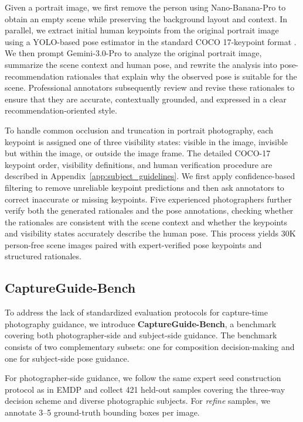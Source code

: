 \documentclass{llmxive}
\begin{document}
Given a portrait image, we first remove the person using Nano-Banana-Pro \cite{google_nanobananapro} to obtain an empty scene while preserving the background layout and context.
In parallel, we extract initial human keypoints from the original portrait image using a YOLO-based pose estimator \citep{jocher2026ultralyticsyolo26unifiedrealtime} in the standard COCO 17-keypoint format \cite{lin2014microsoft}.
We then prompt Gemini-3.0-Pro to analyze the original portrait image, summarize the scene context and human pose, and rewrite the analysis into pose-recommendation rationales that explain why the observed pose is suitable for the scene. Professional annotators subsequently review and revise these rationales to ensure that they are accurate, contextually grounded, and expressed in a clear recommendation-oriented style.

To handle common occlusion and truncation in portrait photography, each keypoint is assigned one of three visibility states: visible in the image, invisible but within the image, or outside the image frame. The detailed COCO-17 keypoint order, visibility definitions, and human verification procedure are described in Appendix~\ref{app:subject_guidelines}. We first apply confidence-based filtering to remove unreliable keypoint predictions and then ask annotators to correct inaccurate or missing keypoints. Five experienced photographers further verify both the generated rationales and the pose annotations, checking whether the rationales are consistent with the scene context and whether the keypoints and visibility states accurately describe the human pose. This process yields 30K person-free scene images paired with expert-verified pose keypoints and structured rationales.

\subsection{CaptureGuide-Bench}
\label{captureguide-bench}
To address the lack of standardized evaluation protocols for capture-time photography guidance, we introduce \textbf{CaptureGuide-Bench}, a benchmark covering both photographer-side and subject-side guidance. The benchmark consists of two complementary subsets: one for composition decision-making and one for subject-side pose guidance.

For photographer-side guidance, we follow the same expert seed construction protocol as in EMDP
and collect 421 held-out samples covering the three-way decision scheme and diverse photographic subjects. For \textit{refine} samples, we annotate 3--5 ground-truth bounding boxes per image.
\end{document}
